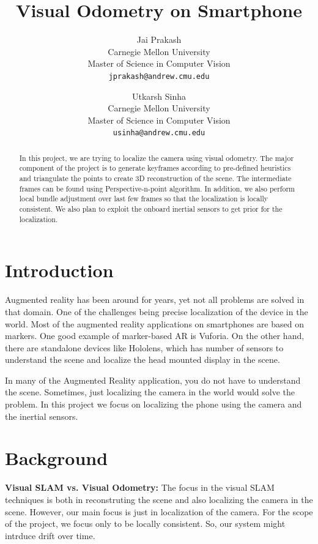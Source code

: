 \documentclass[12pt,twocolumn,letterpaper]{article}
\begin{document}
\title{Visual Odometry on Smartphone}

\author{Jai Prakash\\
Carnegie Mellon University\\
Master of Science in Computer Vision\\
{\tt\small jprakash@andrew.cmu.edu}
\and
Utkarsh Sinha\\
Carnegie Mellon University\\
Master of Science in Computer Vision\\
{\tt\small usinha@andrew.cmu.edu}
}

\maketitle

\begin{abstract}
In this project, we are trying to localize the camera using visual odometry. The major component of the project is to generate keyframes according to pre-defined heuristics and triangulate the points to create 3D reconstruction of the scene. The intermediate frames can be found using Perspective-n-point algorithm. In addition, we also perform local bundle adjustment over last few frames so that the localization is locally consistent. We also plan to exploit the onboard inertial sensors to get prior for the localization.
\end{abstract}

\section{Introduction}

Augmented reality has been around for years, yet not all problems are solved in that domain. One of the challenges being precise localization of the device in the world. Most of the augmented reality applications on smartphones are based on markers. One good example of marker-based AR is Vuforia. On the other hand, there are standalone devices like Hololens, which has number of sensors to understand the scene and localize the head mounted display in the scene.

In many of the Augmented Reality application, you do not have to understand the scene. Sometimes, just localizing the camera in the world would solve the problem. In this project we focus on localizing the phone using the camera and the inertial sensors.

\section{Background}
\textbf{Visual SLAM vs. Visual Odometry: } The focus in the visual SLAM techniques is both in reconstruting the scene and also localizing the camera in the scene. However, our main focus is just in localization of the camera. For the scope of the project, we focus only to be locally consistent. So, our system might intrduce drift over time.
\end{document}

